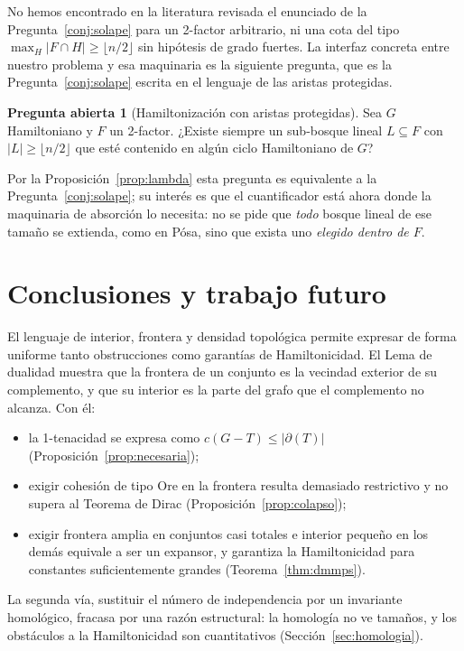 \documentclass[11pt,a4paper]{article}
\theoremstyle{definition}
\newtheorem{pregunta}[teorema]{Pregunta abierta}
\theoremstyle{remark}
\begin{document}
No hemos encontrado en la literatura revisada el enunciado de la Pregunta~\ref{conj:solape} para un 2-factor arbitrario, ni una cota del tipo $\max_H|F\cap H|\ge\lfloor n/2\rfloor$ sin hipótesis de grado fuertes. La interfaz concreta entre nuestro problema y esa maquinaria es la siguiente pregunta, que es la Pregunta~\ref{conj:solape} escrita en el lenguaje de las aristas protegidas.

\begin{pregunta}[Hamiltonización con aristas protegidas]\label{conj:protegidas}
Sea $G$ Hamiltoniano y $F$ un 2-factor. ¿Existe siempre un sub-bosque lineal $L\subseteq F$ con $|L|\ge\lfloor n/2\rfloor$ que esté contenido en algún ciclo Hamiltoniano de $G$?
\end{pregunta}

Por la Proposición~\ref{prop:lambda} esta pregunta es equivalente a la Pregunta~\ref{conj:solape}; su interés es que el cuantificador está ahora donde la maquinaria de absorción lo necesita: no se pide que \emph{todo} bosque lineal de ese tamaño se extienda, como en Pósa, sino que exista uno \emph{elegido dentro de $F$}.


\section{Conclusiones y trabajo futuro}

El lenguaje de interior, frontera y densidad topológica permite expresar de forma uniforme tanto obstrucciones como garantías de Hamiltonicidad. El Lema de dualidad muestra que la frontera de un conjunto es la vecindad exterior de su complemento, y que su interior es la parte del grafo que el complemento no alcanza. Con él:
\begin{itemize}
\item la 1-tenacidad se expresa como $c(G-T)\le|\partial(T)|$ (Proposición~\ref{prop:necesaria});
\item exigir cohesión de tipo Ore en la frontera resulta demasiado restrictivo y no supera al Teorema de Dirac (Proposición~\ref{prop:colapso});
\item exigir frontera amplia en conjuntos casi totales e interior pequeño en los demás equivale a ser un expansor, y garantiza la Hamiltonicidad para constantes suficientemente grandes (Teorema~\ref{thm:dmmps}).
\end{itemize}

La segunda vía, sustituir el número de independencia por un invariante homológico, fracasa por una razón estructural: la homología no ve tamaños, y los obstáculos a la Hamiltonicidad son cuantitativos (Sección~\ref{sec:homologia}).
\end{document}
